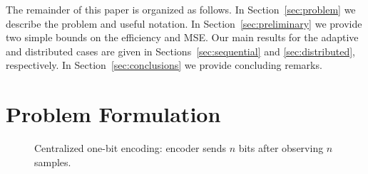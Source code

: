 \documentclass[letterpaper, 11pt]{IEEEtran}      %
\begin{document}
The remainder of this paper is organized as follows. In Section~\ref{sec:problem} we describe the problem and useful notation. In Section~\ref{sec:preliminary} we provide two simple bounds on the efficiency and MSE. Our main results for the adaptive and distributed cases are given in Sections~\ref{sec:sequential} and \ref{sec:distributed}, respectively. In Section~\ref{sec:conclusions} we provide concluding remarks. 

\section{Problem Formulation \label{sec:problem}}

\begin{figure}
\begin{center}
\end{center}
\caption{\label{fig:centralized} Centralized one-bit encoding: encoder sends $n$ bits after observing $n$ samples.}
\end{figure}
\end{document}
